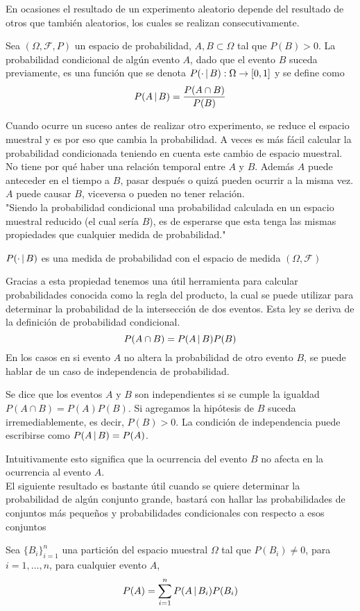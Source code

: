 En ocasiones el resultado de un experimento aleatorio depende del resultado de otros que también aleatorios, los cuales se realizan consecutivamente.\\
\begin{Def}
    Sea $(\Omega,\mathscr{F},P)$ un espacio de probabilidad, $A,B\subset\Omega$ tal que $P(B)>0$. La probabilidad condicional de algún evento $A$, dado que el evento $B$ suceda previamente, es una función que se denota $P(\cdot\thinspace|\thinspace B):\Omega\rightarrow [0,1]$ y se define como $$P(A\thinspace|\thinspace B)=\frac{P(A\cap B)}{P(B)}$$
\end{Def}
Cuando ocurre un suceso antes de realizar otro experimento, se reduce el espacio muestral y es por eso que cambia la probabilidad. A veces es más fácil calcular la probabilidad condicionada teniendo en cuenta este cambio de espacio muestral.
No tiene por qué haber una relación temporal entre $A$ y $B$. Además $A$ puede anteceder en el tiempo a $B$, pasar después o quizá pueden ocurrir a la misma vez. $A$ puede causar $B$, viceversa o pueden no tener relación.\\
"Siendo la probabilidad condicional una probabilidad calculada en un espacio muestral reducido (el cual sería $B$), es de esperarse que esta tenga las mismas propiedades que cualquier medida de probabilidad."
\begin{Prop}
    $P(\cdot\thinspace|\thinspace B)$ es una medida de probabilidad con el espacio de medida $(\Omega,\mathscr{F})$
\end{Prop}
Gracias a esta propiedad tenemos una útil herramienta para calcular probabilidades conocida como la regla del producto, la cual se puede utilizar para determinar la probabilidad de la intersección de dos eventos. Esta ley se deriva de la definición de probabilidad condicional.
$$P(A\cap B)=P(A\thinspace|\thinspace B)P(B)$$
En los casos en si evento $A$ no altera la probabilidad de otro evento $B$, se puede hablar de un caso de independencia de probabilidad.
\begin{Def}
    Se dice que los eventos $A$ y $B$ son independientes si se cumple la igualdad $P(A\cap B)=P(A)P(B)$. Si agregamos la hipótesis de $B$ suceda irremediablemente, es decir, $P(B)>0$. La condición de independencia puede escribirse como $P(A\thinspace|\thinspace B)=P(A)$.
\end{Def}
Intuitivamente esto significa que la ocurrencia del evento $B$ no afecta en la ocurrencia al evento $A$.\\
El siguiente resultado es bastante útil cuando se quiere determinar la probabilidad de algún conjunto grande, bastará con hallar las probabilidades de conjuntos más pequeños y probabilidades condicionales con respecto a esos conjuntos
\begin{Teo}
    Sea $\{B_i\}^{n}_{i=1}$ una partición del espacio muestral $\Omega$ tal que $P(B_i)\not=0$, para  $i=1,\ldots,n$, para cualquier evento $A$, $$P(A)=\sum_{i=1}^n P(A\thinspace|\thinspace B_i)P(B_i)$$
\end{Teo}


